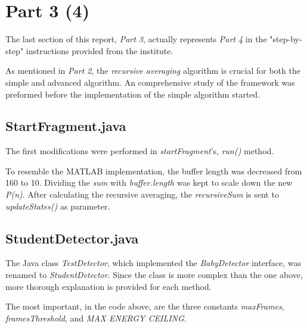 \newpage
\section{Part 3 (4)}
The last section of this report, \emph{Part 3}, actually represents \emph{Part 4}
in the "step-by-step" instructions provided from the institute.

As mentioned in \emph{Part 2}, the \emph{recursive averaging} algorithm is
crucial for both the simple and advanced algorithm. An comprehensive study of 
the framework was preformed before the implementation of the simple algorithm
started.

\subsection{StartFragment.java}
The first modifications were performed in \emph{startFragment}'s,
\emph{run()} method. 



To resemble the MATLAB implementation, the buffer length was decreased from 160
to 10. Dividing the \emph{sum} with \emph{buffer.length} was kept to scale down 
the new \emph{P(n)}. After calculating the recursive averaging, the 
\emph{recursiveSum} is sent to \emph{updateStates()} as parameter.

\subsection{StudentDetector.java}
The Java class \emph{TestDetector}, which implemented the 
\emph{BabyDetector} interface, was renamed to \emph{StudentDetector}. Since the 
class is more complex than the one above, more thorough explanation is provided 
for each method.



The most important, in the code above, are the three constants
\emph{maxFrames}, \emph{framesThreshold}, and \emph{MAX ENERGY CEILING}.

